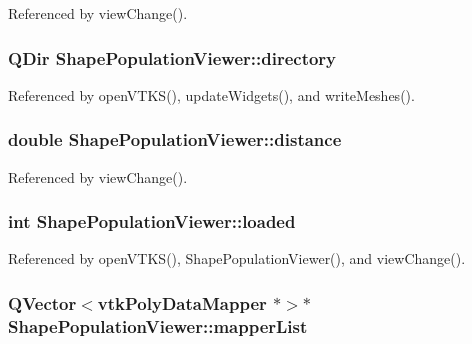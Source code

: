 Referenced by view\-Change().

\hypertarget{class_shape_population_viewer_aa466212a0536242cedb4233e4cf6492b}{
\subsubsection[{directory}]{\setlength{\rightskip}{0pt plus 5cm}Q\-Dir Shape\-Population\-Viewer\-::directory\hspace{0.3cm}{\ttfamily [protected]}}}\label{class_shape_population_viewer_aa466212a0536242cedb4233e4cf6492b}


Referenced by open\-V\-T\-K\-S(), update\-Widgets(), and write\-Meshes().

\hypertarget{class_shape_population_viewer_a55229dfa2500b5417e5afafefcee1e0e}{
\subsubsection[{distance}]{\setlength{\rightskip}{0pt plus 5cm}double Shape\-Population\-Viewer\-::distance\hspace{0.3cm}{\ttfamily [protected]}}}\label{class_shape_population_viewer_a55229dfa2500b5417e5afafefcee1e0e}


Referenced by view\-Change().

\hypertarget{class_shape_population_viewer_a6e4ce4ade82b335f5a69ddf054314f16}{
\subsubsection[{loaded}]{\setlength{\rightskip}{0pt plus 5cm}int Shape\-Population\-Viewer\-::loaded\hspace{0.3cm}{\ttfamily [protected]}}}\label{class_shape_population_viewer_a6e4ce4ade82b335f5a69ddf054314f16}


Referenced by open\-V\-T\-K\-S(), Shape\-Population\-Viewer(), and view\-Change().

\hypertarget{class_shape_population_viewer_a512b562448c7236c0c1bdf981a0a7322}{
\subsubsection[{mapper\-List}]{\setlength{\rightskip}{0pt plus 5cm}Q\-Vector$<$vtk\-Poly\-Data\-Mapper $\ast$$>$$\ast$ Shape\-Population\-Viewer\-::mapper\-List\hspace{0.3cm}{\ttfamily [protected]}}}\label{class_shape_population_viewer_a512b562448c7236c0c1bdf981a0a7322}


